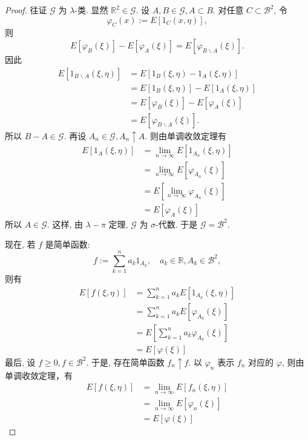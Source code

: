 \begin{proof}
    往证 $\mathscr{G}$ 为 $\lambda$-类. 显然 $\mathbb{R}^2 \in \mathscr{G}$. 设 $A, B \in \mathscr{G}, A \subset B$. 对任意 $C \subset \mathscr{B}^2$, 令
    $$
        \varphi_C(x):=E\left[1_C(x, \eta)\right],
    $$
    则
    $$
        E\left[\varphi_B(\xi)\right]-E\left[\varphi_A(\xi)\right]=E\left[\varphi_{B \backslash A}(\xi)\right] .
    $$
    因此
    $$
        \begin{aligned}
            E\left[1_{B \backslash A}(\xi, \eta)\right] & =E\left[1_B(\xi, \eta)-1_A(\xi, \eta)\right]               \\
                                                        & =E\left[1_B(\xi, \eta)\right]-E\left[1_A(\xi, \eta)\right] \\
                                                        & =E\left[\varphi_B(\xi)\right]-E\left[\varphi_A(\xi)\right] \\
                                                        & =E\left[\varphi_{B \backslash A}(\xi)\right] .
        \end{aligned}
    $$
    所以 $B-A \in \mathscr{G}$. 再设 $A_n \in \mathscr{G}, A_n \uparrow A$. 则由单调收敛定理有
    $$
        \begin{aligned}
            E\left[1_A(\xi, \eta)\right] & =\lim _{n \rightarrow \infty} E\left[1_{A_n}(\xi, \eta)\right] \\
                                         & =\lim _{n \rightarrow \infty} E\left[\varphi_{A_n}(\xi)\right] \\
                                         & =E\left[\lim _{n \rightarrow \infty} \varphi_{A_n}(\xi)\right] \\
                                         & =E\left[\varphi_A(\xi)\right]
        \end{aligned}
    $$
    所以 $A \in \mathscr{G}$. 这样, 由 $\lambda-\pi$ 定理, $\mathscr{G}$ 为 $\sigma$-代数. 于是 $\mathscr{G}=\mathscr{B}^2$.

    现在, 若 $f$ 是简单函数:
    $$
        f:=\sum_{k=1}^n a_k 1_{A_k}, \quad a_k \in \mathbb{R}, A_k \in \mathscr{B}^2,
    $$
    则有
    $$
        \begin{aligned}
            E[f(\xi, \eta)] & =\sum_{k=1}^n a_k E\left[1_{A_k}(\xi, \eta)\right] \\
                            & =\sum_{k=1}^n a_k E\left[\varphi_{A_k}(\xi)\right] \\
                            & =E\left[\sum_{k=1}^n a_k \varphi_{A_k}(\xi)\right] \\
                            & =E[\varphi(\xi)]
        \end{aligned}
    $$
    最后, 设 $f \geqslant 0, f \in \mathscr{B}^2$. 于是, 存在简单函数 $f_n \uparrow f$. 以 $\varphi_n$ 表示 $f_n$ 对应的 $\varphi$, 则由单调收敛定理，有
    $$
        \begin{aligned}
            E[f(\xi, \eta)] & =\lim _{n \rightarrow \infty} E\left[f_n(\xi, \eta)\right] \\
                            & =\lim _{n \rightarrow \infty} E\left[\varphi_n(\xi)\right] \\
                            & =E[\varphi(\xi)]
        \end{aligned}
    $$
\end{proof}
